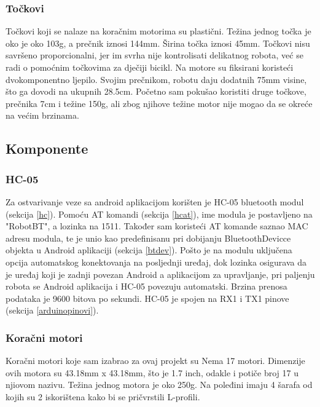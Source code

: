 \documentclass[../Document.tex]{subfiles}
\begin{document}
\subsubsection{Točkovi}
Točkovi koji se nalaze na koračnim motorima su plastični. Težina jednog točka je oko je oko 103g, a prečnik iznosi 144mm. Širina točka iznosi 45mm. Točkovi nisu savršeno proporcionalni, jer im svrha nije kontrolisati delikatnog robota, već se radi o pomoćnim točkovima za dječiji bicikl. Na motore su fiksirani koristeći dvokomponentno ljepilo. Svojim prečnikom, robotu daju dodatnih 75mm visine, što ga dovodi na ukupnih 28.5cm. Početno sam pokušao koristiti druge točkove, prečnika 7cm i težine 150g, ali zbog njihove težine motor nije mogao da se okreće na većim brzinama.

\subsection{Komponente}

\subsubsection{HC-05}
Za ostvarivanje veze sa android aplikacijom korišten je HC-05 bluetooth modul (sekcija \ref{hc}). Pomoću AT komandi (sekcija \ref{hcat}), ime modula je postavljeno na "RobotBT", a lozinka na 1511. Također sam koristeći AT komande saznao MAC adresu modula, te je unio kao predefinisanu pri dobijanju BluetoothDevicce objekta u Android aplikaciji (sekcija \ref{btdev}). Pošto je na modulu uključena opcija automatskog konektovanja na posljednji uređaj, dok lozinka osigurava da je uređaj koji je zadnji povezan Android a aplikacijom za upravljanje, pri paljenju robota se Android aplikacija i HC-05 povezuju automatski. Brzina prenosa podataka je 9600 bitova po sekundi. HC-05 je spojen na RX1 i TX1 pinove (sekcija \ref{arduinopinovi}).

\subsubsection{Koračni motori}
Koračni motori koje sam izabrao za ovaj projekt su Nema 17 motori. Dimenzije ovih motora su 43.18mm x 43.18mm, što je 1.7 inch, odakle i potiče broj 17 u njiovom nazivu. Težina jednog motora je oko 250g. Na poleđini imaju 4 šarafa od kojih su 2 iskorištena kako bi se pričvrstili L-profili.

\end{document}
